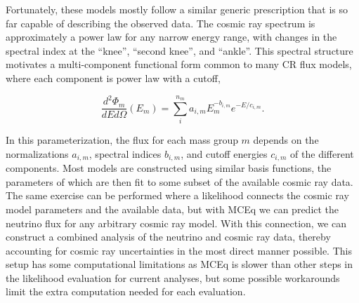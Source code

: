Fortunately, these models mostly follow a similar generic prescription that is so far capable of describing the observed data.
The cosmic ray spectrum is approximately a power law for any narrow energy range, with changes in the spectral index at the ``knee'', ``second knee'', and ``ankle''.
This spectral structure motivates a multi-component functional form common to many CR flux models, where each component is power law with a cutoff,
\begin{linenomath}
	\begin{equation}
	\frac{d^2\Phi_m}{dEd\Omega}\left(E_m\right) = \sum_i^{n_m} a_{i,m} E_m^{-b_{i,m}} e^{-E/c_{i,m}}.
	\end{equation}
	\label{eq:cr_spectrum}
\end{linenomath}
In this parameterization, the flux for each mass group $m$ depends on the normalizations $a_{i,m}$, spectral indices $b_{i,m}$, and cutoff energies $c_{i,m}$ of the different components.
Most models are constructed using similar basis functions, the parameters of which are then fit to some subset of the available cosmic ray data.
The same exercise can be performed where a likelihood connects the cosmic ray model parameters and the available data, but with MCEq we can predict the neutrino flux for any arbitrary cosmic ray model.
With this connection, we can construct a combined analysis of the neutrino and cosmic ray data, thereby accounting for cosmic ray uncertainties in the most direct manner possible.
This setup has some computational limitations as MCEq is slower than other steps in the likelihood evaluation for current analyses, but some possible workarounds limit the extra computation needed for each evaluation.

